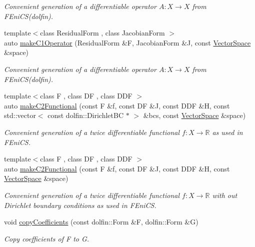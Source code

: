 \begin{DoxyCompactItemize}
\begin{DoxyCompactList}\small\item\em Convenient generation of a differentiable operator $A: X\rightarrow X$ from F\-Eni\-C\-S(dolfin). \end{DoxyCompactList}\item 
{\footnotesize template$<$class Residual\-Form , class Jacobian\-Form $>$ }\\auto \hyperlink{namespaceSpacy_1_1FEniCS_a327fc1d746fab9fbc5c703efe31de13a}{make\-C1\-Operator} (Residual\-Form \&F, Jacobian\-Form \&J, const \hyperlink{classSpacy_1_1VectorSpace}{Vector\-Space} \&space)
\begin{DoxyCompactList}\small\item\em Convenient generation of a differentiable operator $A: X\rightarrow X$ from F\-Eni\-C\-S(dolfin). \end{DoxyCompactList}\item 
{\footnotesize template$<$class F , class D\-F , class D\-D\-F $>$ }\\auto \hyperlink{namespaceSpacy_1_1FEniCS_a78db716003d17d5f781dfcb13a183519}{make\-C2\-Functional} (const F \&f, const D\-F \&J, const D\-D\-F \&H, const std\-::vector$<$ const dolfin\-::\-Dirichlet\-B\-C $\ast$ $>$ \&bcs, const \hyperlink{classSpacy_1_1VectorSpace}{Vector\-Space} \&space)
\begin{DoxyCompactList}\small\item\em Convenient generation of a twice differentiable functional $f: X\rightarrow \mathbb{R}$ as used in F\-Eni\-C\-S. \end{DoxyCompactList}\item 
{\footnotesize template$<$class F , class D\-F , class D\-D\-F $>$ }\\auto \hyperlink{namespaceSpacy_1_1FEniCS_a4e69e5b7265feac21653bfc2da725a75}{make\-C2\-Functional} (const F \&f, const D\-F \&J, const D\-D\-F \&H, const \hyperlink{classSpacy_1_1VectorSpace}{Vector\-Space} \&space)
\begin{DoxyCompactList}\small\item\em Convenient generation of a twice differentiable functional $f: X\rightarrow \mathbb{R}$ with out Dirichlet boundary conditions as used in F\-Eni\-C\-S. \end{DoxyCompactList}\item 
void \hyperlink{group__FenicsGroup_gab3d4c7c1e91a50e4e816598258b6edce}{copy\-Coefficients} (const dolfin\-::\-Form \&F, dolfin\-::\-Form \&G)
\begin{DoxyCompactList}\small\item\em Copy coefficients of F to G. \end{DoxyCompactList}\item 

\end{DoxyCompactItemize}
